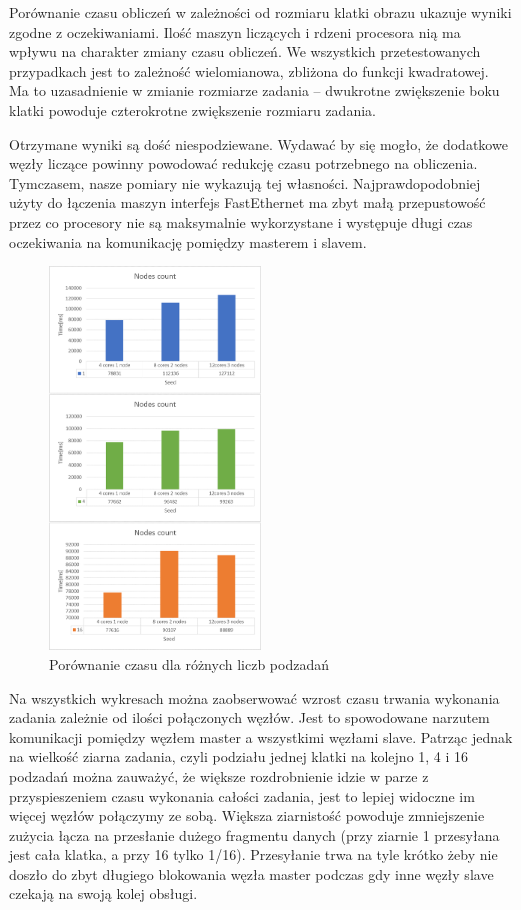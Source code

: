 \documentclass[a4paper]{article}
\begin{document}
Porównanie czasu obliczeń w zależności od rozmiaru klatki obrazu ukazuje wyniki zgodne z oczekiwaniami. Ilość maszyn liczących i rdzeni procesora nią ma wpływu na charakter zmiany czasu obliczeń. We wszystkich przetestowanych przypadkach jest to zależność wielomianowa, zbliżona do funkcji kwadratowej. Ma to uzasadnienie w zmianie rozmiarze zadania – dwukrotne zwiększenie boku klatki powoduje czterokrotne zwiększenie rozmiaru zadania.

Otrzymane wyniki są dość niespodziewane. Wydawać by się mogło, że dodatkowe węzły liczące powinny powodować redukcję czasu potrzebnego na obliczenia. Tymczasem, nasze pomiary nie wykazują tej własności. Najprawdopodobniej użyty do łączenia maszyn interfejs FastEthernet ma zbyt małą przepustowość przez co procesory nie są maksymalnie wykorzystane i występuje długi czas oczekiwania na komunikację pomiędzy masterem i slavem.

\begin{figure}[H]
    \centering
    \includegraphics[width=0.5\textwidth]{3.png}
    \caption{Porównanie czasu dla różnych liczb podzadań}
    \label{fig:my_frac}
\end{figure}

Na wszystkich wykresach można zaobserwować wzrost czasu trwania wykonania zadania zależnie od ilości połączonych węzłów. Jest to spowodowane narzutem komunikacji pomiędzy węzłem master a wszystkimi węzłami slave. Patrząc jednak na wielkość ziarna zadania, czyli podziału jednej klatki na kolejno 1, 4 i 16 podzadań można zauważyć, że większe rozdrobnienie idzie w parze z przyspieszeniem czasu wykonania całości zadania, jest to lepiej widoczne im więcej węzłów połączymy ze sobą. Większa ziarnistość powoduje zmniejszenie zużycia łącza na przesłanie dużego fragmentu danych (przy ziarnie 1 przesyłana jest cała klatka, a przy 16 tylko 1/16). Przesyłanie trwa na tyle krótko żeby nie doszło do zbyt długiego blokowania węzła master podczas gdy inne węzły slave czekają na swoją kolej obsługi.
\end{document}
